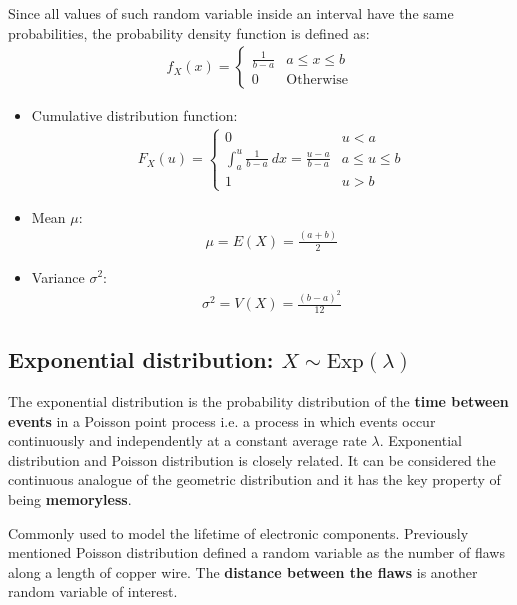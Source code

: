 \documentclass[10pt,a4paper]{article}
\begin{document}
Since all values of such random variable inside an interval have the same probabilities, the
probability density function is defined as:
\begin{align*}
    f_X(x) = 
    \begin{cases}
        \frac{1}{b-a} & a \leq x \leq b \\
        0 & \text{Otherwise}    
    \end{cases}
\end{align*}
\begin{itemize}
    \item Cumulative distribution function:
    \begin{align*}
        F_X(u) = 
        \begin{cases}
            0 & u < a \\
            \int_a^u \frac{1}{b-a} \: dx = \frac{u-a}{b-a} & a\leq u\leq b \\
            1 & u > b
        \end{cases}
    \end{align*}
    \item Mean $\mu$:
    \begin{align*}
        \mu = E(X) = \frac{(a+b)}{2}
    \end{align*}
    \item Variance $\sigma^2$:
    \begin{align*}
        \sigma^2 = V(X) = \frac{(b-a)^2}{12}
    \end{align*}
\end{itemize}

\subsection{Exponential distribution: $X \sim \text{Exp}(\lambda)$}

The exponential distribution is the probability distribution of the \textbf{time between events} in a Poisson
point process i.e. a process in which events occur continuously and independently at a constant
average rate $\lambda$. Exponential distribution and Poisson distribution is closely related. It can
be considered the continuous analogue of the geometric distribution and it has the key property of
being \textbf{memoryless}. 

Commonly used to model the lifetime of electronic components. Previously mentioned Poisson
distribution defined a random variable as the number of flaws along a length of copper wire. The
\textbf{distance between the flaws} is another random variable of interest. 
\end{document}
